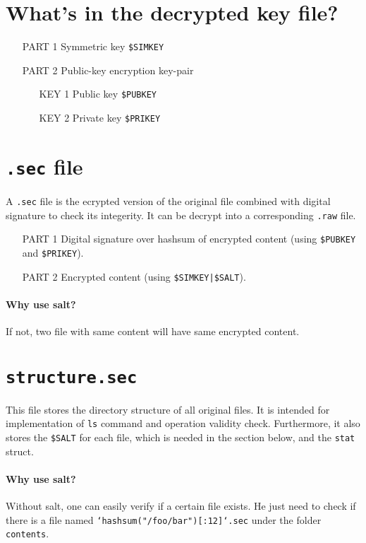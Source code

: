 \documentclass{article}
\begin{document}
\section{What's in the decrypted key file?}

\begin{itemize}
    \item [PART 1] Symmetric key \texttt{\$SIMKEY}
    \item [PART 2] Public-key encryption key-pair
    \begin{itemize}
        \item [KEY 1] Public key \texttt{\$PUBKEY}
        \item [KEY 2] Private key \texttt{\$PRIKEY}
    \end{itemize}
\end{itemize}

\section{\texttt{.sec} file}
A \texttt{.sec} file is the ecrypted version of the original file combined with digital signature to check its integerity. It can be decrypt into a corresponding \texttt{.raw} file.

\begin{itemize}
    \item [PART 1] Digital signature over hashsum of encrypted content (using \texttt{\$PUBKEY} and \texttt{\$PRIKEY}).
    \item [PART 2] Encrypted content (using \texttt{\$SIMKEY|\$SALT}).
\end{itemize}

\paragraph{Why use salt?} If not, two file with same content will have same encrypted content.

\section{\texttt{structure.sec}}

This file stores the directory structure of all original files. It is intended for implementation of \texttt{ls} command and operation validity check. Furthermore, it also stores the \texttt{\$SALT} for each file, which is needed in the section below, and the \texttt{stat} struct.

\paragraph{Why use salt?} Without salt, one can easily verify if a certain file exists. He just need to check if there is a file named \texttt{`hashsum("/foo/bar")[:12]`.sec} under the folder \texttt{contents}.
\end{document}
